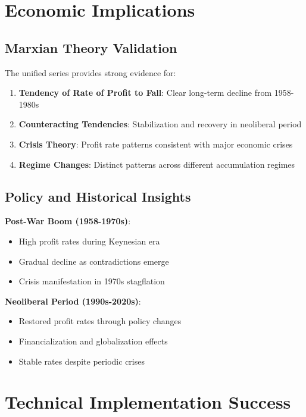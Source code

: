 \documentclass[12pt]{article}
\begin{document}
\section{Economic Implications}

\subsection{Marxian Theory Validation}

The unified series provides strong evidence for:

\begin{enumerate}
    \item \textbf{Tendency of Rate of Profit to Fall}: Clear long-term decline from 1958-1980s
    \item \textbf{Counteracting Tendencies}: Stabilization and recovery in neoliberal period
    \item \textbf{Crisis Theory}: Profit rate patterns consistent with major economic crises
    \item \textbf{Regime Changes}: Distinct patterns across different accumulation regimes
\end{enumerate}

\subsection{Policy and Historical Insights}

\textbf{Post-War Boom (1958-1970s)}:
\begin{itemize}
    \item High profit rates during Keynesian era
    \item Gradual decline as contradictions emerge
    \item Crisis manifestation in 1970s stagflation
\end{itemize}

\textbf{Neoliberal Period (1990s-2020s)}:
\begin{itemize}
    \item Restored profit rates through policy changes
    \item Financialization and globalization effects
    \item Stable rates despite periodic crises
\end{itemize}

\section{Technical Implementation Success}
\end{document}
